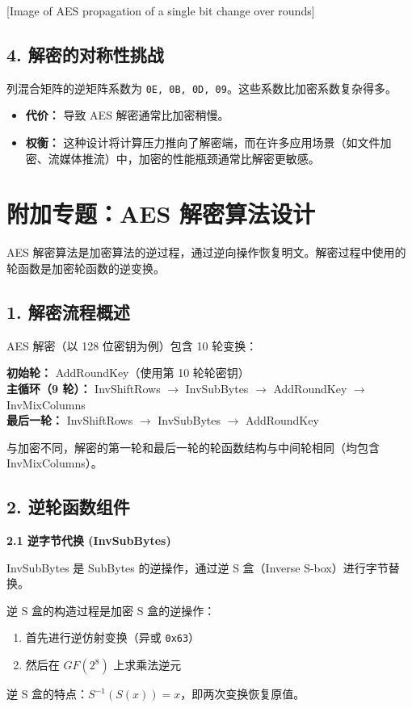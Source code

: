 \documentclass[12pt, a4paper]{article}
\begin{document}
[Image of AES propagation of a single bit change over rounds]

\subsection{4. 解密的对称性挑战}
列混合矩阵的逆矩阵系数为 \texttt{0E, 0B, 0D, 09}。这些系数比加密系数复杂得多。
\begin{itemize}
    \item \textbf{代价：} 导致 AES 解密通常比加密稍慢。
    \item \textbf{权衡：} 这种设计将计算压力推向了解密端，而在许多应用场景（如文件加密、流媒体推流）中，加密的性能瓶颈通常比解密更敏感。
\end{itemize}
\section{\color{aesblue}附加专题：AES 解密算法设计}

AES 解密算法是加密算法的逆过程，通过逆向操作恢复明文。解密过程中使用的轮函数是加密轮函数的逆变换。

\subsection{1. 解密流程概述}

AES 解密（以 128 位密钥为例）包含 10 轮变换：

\begin{tcolorbox}[notebox=解密流程]
\textbf{初始轮：} AddRoundKey（使用第 10 轮轮密钥）\\
\textbf{主循环（9 轮）：} InvShiftRows $\rightarrow$ InvSubBytes $\rightarrow$ AddRoundKey $\rightarrow$ InvMixColumns\\
\textbf{最后一轮：} InvShiftRows $\rightarrow$ InvSubBytes $\rightarrow$ AddRoundKey
\end{tcolorbox}

与加密不同，解密的第一轮和最后一轮的轮函数结构与中间轮相同（均包含 InvMixColumns）。

\subsection{2. 逆轮函数组件}

\textbf{2.1 逆字节代换 (InvSubBytes)}

InvSubBytes 是 SubBytes 的逆操作，通过逆 S 盒（Inverse S-box）进行字节替换。

\begin{tcolorbox}[notebox=逆 S 盒构造]
逆 S 盒的构造过程是加密 S 盒的逆操作：
\begin{enumerate}
    \item 首先进行逆仿射变换（异或 \texttt{0x63}）
    \item 然后在 $GF(2^8)$ 上求乘法逆元
\end{enumerate}
逆 S 盒的特点：$S^{-1}(S(x)) = x$，即两次变换恢复原值。
\end{tcolorbox}
\end{document}
